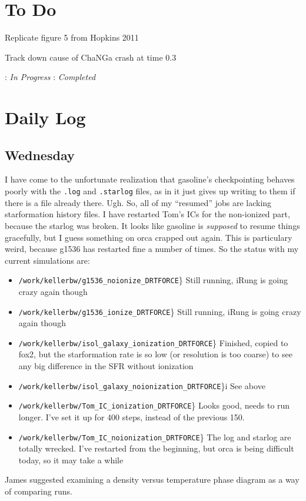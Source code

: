 \documentclass[11pt,letterpaper]{article}
\begin{document}
\section{To Do}
\begin{bullets}
\item[\textleaf] Replicate figure 5 from Hopkins 2011
\item Track down cause of ChaNGa crash at time 0.3
\end{bullets}

\textleaf : \textit{In Progress} \qquad \checkmark : \textit{Completed}
\section{Daily Log}

\subsection{Wednesday}

I have come to the unfortunate realization that gasoline's checkpointing
behaves poorly with the \verb!.log! and \verb!.starlog! files, as in it
just gives up writing to them if there is a file already there. Ugh. So,
all of my ``resumed'' jobs are lacking starformation history files. I
have restarted Tom's ICs for the non-ionized part, because the starlog
was broken. It looks like gasoline is \textit{supposed} to resume things
gracefully, but I guess something on orca crapped out again. This is
particulary weird, because g1536 has restarted fine a number of times.
So the status with my current simulations are:

\begin{itemize}
\item
  \verb!/work/kellerbw/g1536_noionize_DRTFORCE!\} Still running, iRung
  is going crazy again though
\item
  \verb!/work/kellerbw/g1536_ionize_DRTFORCE!\} Still running, iRung is
  going crazy again though
\item
  \verb!/work/kellerbw/isol_galaxy_ionization_DRTFORCE!\checkmark\}
  Finished, copied to fox2, but the starformation rate is so low (or
  resolution is too coarse) to see any big difference in the SFR without
  ionization
\item
  \verb!/work/kellerbw/isol_galaxy_noionization_DRTFORCE!\checkmark\}i
  See above
\item
  \verb!/work/kellerbw/Tom_IC_ionization_DRTFORCE!\checkmark\} Looks
  good, needs to run longer. I've set it up for 400 steps, instead of
  the previous 150.
\item
  \verb!/work/kellerbw/Tom_IC_noionization_DRTFORCE!\} The log and
  starlog are totally wrecked. I've restarted from the beginning, but
  orca is being difficult today, so it may take a while
\end{itemize}

James suggested examining a density versus temperature phase diagram as
a way of comparing runs.
\end{document}
